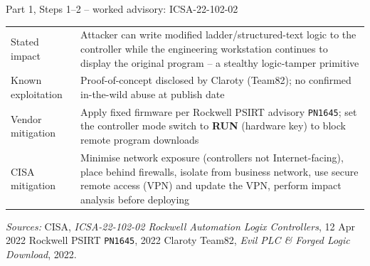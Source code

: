 \documentclass[11pt,a4paper]{article}
\begin{document}
\begin{solutionbox}{Part 1, Steps 1--2 -- worked advisory: ICSA-22-102-02}
\begin{center}
\begin{tabular}{@{}p{3.6cm}p{11.0cm}@{}}
Stated impact           & Attacker can write modified ladder/structured-text logic to the controller while the engineering workstation continues to display the original program -- a stealthy logic-tamper primitive \\
Known exploitation      & Proof-of-concept disclosed by Claroty (Team82); no confirmed in-the-wild abuse at publish date \\
Vendor mitigation       & Apply fixed firmware per Rockwell PSIRT advisory \texttt{PN1645}; set the controller mode switch to \textbf{RUN} (hardware key) to block remote program downloads \\
CISA mitigation         & Minimise network exposure (controllers not Internet-facing), place behind firewalls, isolate from business network, use secure remote access (VPN) and update the VPN, perform impact analysis before deploying \\
\bottomrule
\end{tabular}
\end{center}

{\footnotesize\emph{Sources:} CISA, \emph{ICSA-22-102-02 Rockwell Automation Logix Controllers}, 12 Apr 2022 \textbar{} Rockwell PSIRT \texttt{PN1645}, 2022 \textbar{} Claroty Team82, \emph{Evil PLC \& Forged Logic Download}, 2022.}
\end{solutionbox}
\end{document}
